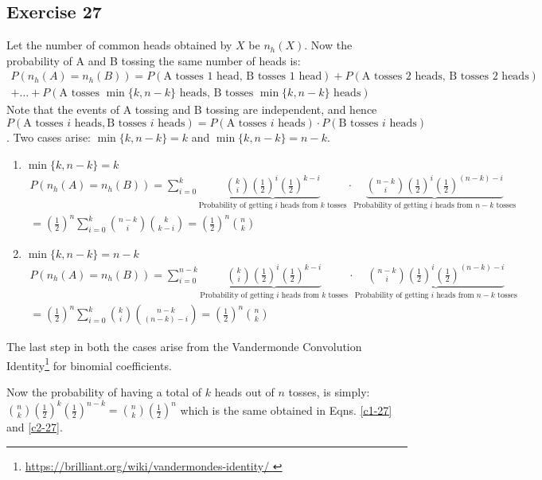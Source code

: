 \documentclass{article}
\begin{document}
\subsection*{Exercise 27}
\begin{flushleft}
Let the number of common heads obtained by \(X\) be \(n_{h}(X)\). Now the probability of A and B tossing the same number of heads is:
\begin{multline}
P(n_{h}(A) = n_{h}(B)) = P(\text{A tosses 1 head, B tosses 1 head}) + P(\text{A tosses 2 heads, B tosses 2 heads})\\+ \ldots + P(\text{A tosses } \min\{k, n-k\} \text{ heads, B tosses } \min\{k, n-k\} \text{ heads})
\end{multline}
Note that the events of A tossing and B tossing are independent, and hence \(P(\text{A tosses } i \text{ heads}, \text{B tosses } i \text{ heads}) = P(\text{A tosses } i \text{ heads}) \cdot P(\text{B tosses } i \text{ heads})\).
Two cases arise: \(\min\{k, n-k\} = k\) and \(\min\{k, n-k\} = n - k\).
\begin{enumerate}
\item \(\min\{k, n-k\} = k\)
\begin{multline}
\label{c1-27}
P(n_{h}(A) = n_{h}(B)) = \displaystyle \sum_{i=0}^{k} \underbrace{\binom{k}{i} \left(\frac{1}{2}\right)^{i} \left(\frac{1}{2}\right)^{k - i}}_{\text{Probability of getting } i \text{ heads from } k \text{ tosses}} \cdot \underbrace{\binom{n-k}{i} \left(\frac{1}{2}\right)^{i} \left(\frac{1}{2}\right)^{(n-k)-i}}_{\text{Probability of getting } i \text{ heads from } n-k \text{ tosses}}\\= \left(\frac{1}{2}\right)^{n} \sum_{i=0}^{k} \binom{n - k}{i} \binom{k}{k-i} = \left(\frac{1}{2}\right)^{n} \binom{n}{k}
\end{multline}

\item \(\min\{k, n-k\} = n-k\)
\begin{multline}
\label{c2-27}
P(n_{h}(A) = n_{h}(B)) = \displaystyle \sum_{i=0}^{n-k} \underbrace{\binom{k}{i} \left(\frac{1}{2}\right)^{i} \left(\frac{1}{2}\right)^{k - i}}_{\text{Probability of getting } i \text{ heads from } k \text{ tosses}} \cdot \underbrace{\binom{n-k}{i} \left(\frac{1}{2}\right)^{i} \left(\frac{1}{2}\right)^{(n-k)-i}}_{\text{Probability of getting } i \text{ heads from } n-k \text{ tosses}}\\= \left(\frac{1}{2}\right)^{n} \sum_{i=0}^{k} \binom{k}{i} \binom{n-k}{(n-k)-i} = \left(\frac{1}{2}\right)^{n} \binom{n}{k}
\end{multline}
\end{enumerate}
The last step in both the cases arise from the Vandermonde Convolution Identity\footnote{\url{https://brilliant.org/wiki/vandermondes-identity/ }} for binomial coefficients.

Now the probability of having a total of \(k\) heads out of \(n\) tosses, is simply: \(\binom{n}{k} \left(\frac{1}{2}\right)^{k} \left(\frac{1}{2}\right)^{n-k} = \binom{n}{k}\left(\frac{1}{2}\right)^{n}\) which is the same obtained in Eqns. \ref{c1-27} and \ref{c2-27}.
\end{flushleft}
\end{document}
